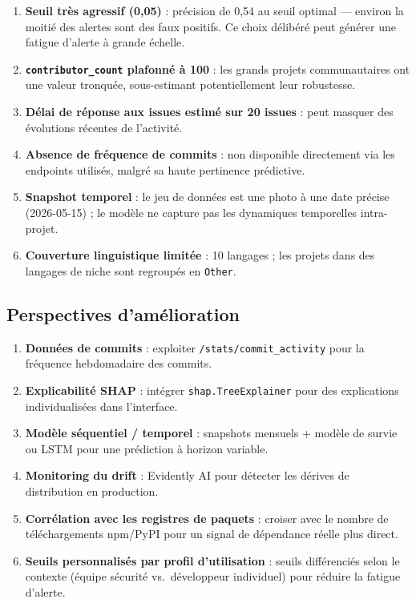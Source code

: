 \documentclass[12pt,a4paper]{article}
\begin{document}
\begin{enumerate}[label=\textbf{L\arabic*.}]
  \item \textbf{Seuil très agressif (0,05)} : précision de 0,54 au seuil optimal --- environ la
    moitié des alertes sont des faux positifs. Ce choix délibéré peut générer une fatigue d'alerte
    à grande échelle.
  \item \textbf{\texttt{contributor\_count} plafonné à 100} : les grands projets communautaires
    ont une valeur tronquée, sous-estimant potentiellement leur robustesse.
  \item \textbf{Délai de réponse aux issues estimé sur 20 issues} : peut masquer des évolutions
    récentes de l'activité.
  \item \textbf{Absence de fréquence de commits} : non disponible directement via les endpoints
    utilisés, malgré sa haute pertinence prédictive.
  \item \textbf{Snapshot temporel} : le jeu de données est une photo à une date précise
    (2026-05-15) ; le modèle ne capture pas les dynamiques temporelles intra-projet.
  \item \textbf{Couverture linguistique limitée} : 10 langages ; les projets dans des langages
    de niche sont regroupés en \texttt{Other}.
\end{enumerate}

\subsection{Perspectives d'amélioration}

\begin{enumerate}[label=\textbf{P\arabic*.}]
  \item \textbf{Données de commits} : exploiter \texttt{/stats/commit\_activity} pour la
    fréquence hebdomadaire des commits.
  \item \textbf{Explicabilité SHAP} : intégrer \texttt{shap.TreeExplainer} pour des
    explications individualisées dans l'interface.
  \item \textbf{Modèle séquentiel / temporel} : snapshots mensuels + modèle de survie ou
    LSTM pour une prédiction à horizon variable.
  \item \textbf{Monitoring du drift} : Evidently AI pour détecter les dérives de distribution
    en production.
  \item \textbf{Corrélation avec les registres de paquets} : croiser avec le nombre de
    téléchargements npm/PyPI pour un signal de dépendance réelle plus direct.
  \item \textbf{Seuils personnalisés par profil d'utilisation} : seuils différenciés selon
    le contexte (équipe sécurité vs.\ développeur individuel) pour réduire la fatigue d'alerte.
\end{enumerate}
\end{document}
